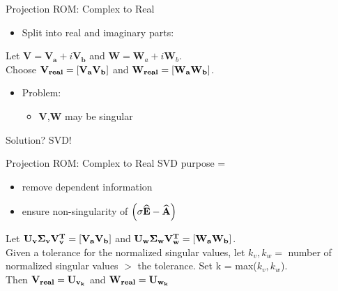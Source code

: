\begin{frame}{Projection ROM: Complex to Real}
\begin{itemize}
    \item <1-> Split into real and imaginary parts:
\end{itemize}
 Let $\mathbf{V} = \mathbf{V_a} + i \mathbf{V_b}$ and $\mathbf W = \mathbf W_a + i \mathbf W_b$.
\\
\bigskip
Choose $\bf V_{real} = \left[V_a V_b\right]$ and $\bf W_{real} = \left[W_a W_b\right]$.
\\
\bigskip

\begin{itemize}
    \item Problem:
    \begin{itemize}
        \item {\bf V},{\bf W} may be singular
    \end{itemize}
\end{itemize}
\bigskip
Solution? SVD!
\end{frame}
\begin{frame}{Projection ROM: Complex to Real}
SVD purpose = 
\begin{itemize}
    \item <1->remove dependent information
    \item <1-> ensure non-singularity of \( \Big( \sigma \widehat{{\bf E}} - \widehat{{\bf A}} \Big) \)
\end{itemize}

\bigskip
Let $\bf U_v \Sigma_v V_v^T = \left[V_a V_b\right]$ and $\bf U_w \Sigma_w V_w^T = \left[W_a W_b\right]$.
\\
\bigskip
Given a tolerance for the normalized singular values, let \(k_v, k_w =\) number of normalized singular values \(>\) the tolerance.
\bigskip
Set k = max(\(k_v, k_w\)).\\
\bigskip
Then \({\bf V_{real}} = {\bf U_{v_k}}\) and \({\bf W_{real}} = {\bf U_{w_k}}\)
\end{frame}

